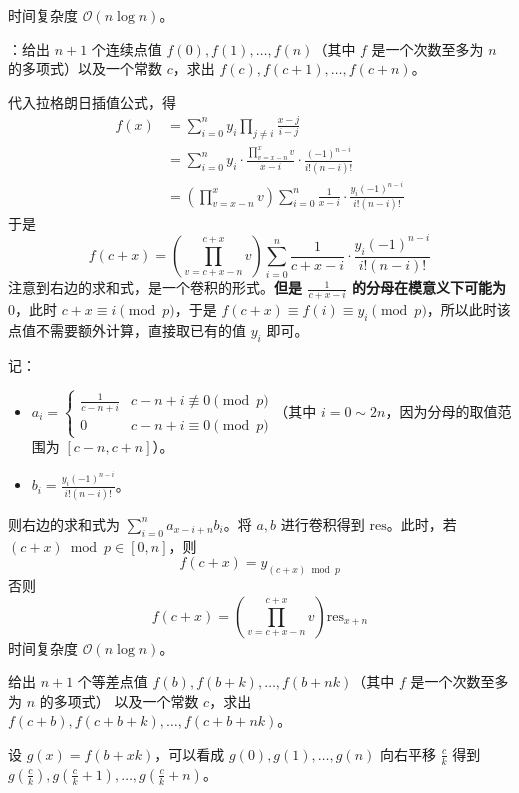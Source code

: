 时间复杂度 $\mathcal{O}(n \log n)$。

：给出 $n + 1$ 个连续点值 $f(0), f(1), \dots, f(n)$（其中 $f$ 是一个次数至多为 $n$ 的多项式）以及一个常数 $c$，求出 $f(c), f(c + 1), \dots, f(c + n)$。

代入拉格朗日插值公式，得
\[
\begin{aligned}
f(x) & = \sum_{i = 0}^n y_i \prod_{j \neq i} \frac{x - j}{i - j} \\
& = \sum_{i = 0}^n y_i \cdot \frac{\prod_{v = x - n}^{x} v}{x - i} \cdot \frac{(-1)^{n - i}}{i!(n - i)!} \\
& = \left(\prod_{v = x - n}^{x} v\right) \sum_{i = 0}^n \frac{1}{x - i} \cdot \frac{y_i(-1)^{n - i}}{i!(n - i)!}
\end{aligned}
\]
于是
\[
f(c + x) = \left( \prod_{v = c + x - n}^{c + x} v \right)\sum_{i = 0}^n \frac{1}{c + x - i} \cdot \frac{y_i(-1)^{n - i}}{i!(n - i)!}
\]
注意到右边的求和式，是一个卷积的形式。\textbf{但是 $\frac{1}{c + x - i}$ 的分母在模意义下可能为 $0$}，此时 $c + x \equiv i \pmod{p}$，于是 $f(c + x) \equiv f(i) \equiv y_i \pmod{p}$，所以此时该点值不需要额外计算，直接取已有的值 $y_i$ 即可。

记：

\begin{itemize}
    \item $a_i = \begin{cases} \frac{1}{c - n + i} & c - n + i \not\equiv 0 \pmod{p} \\ 0 & c - n + i \equiv 0 \pmod{p} \end{cases}$（其中 $i = 0 \sim 2n$，因为分母的取值范围为 $[c - n, c + n]$）。
    \item $b_i = \frac{y_i(-1)^{n - i}}{i!(n - i)!}$。
\end{itemize}

则右边的求和式为 $\sum_{i = 0}^n a_{x - i + n}b_i$。将 $a, b$ 进行卷积得到 $\mathrm{res}$。此时，若 $(c + x) \bmod p \in [0, n]$，则
\[
f(c + x) = y_{(c + x) \bmod p}
\]
否则
\[
f(c + x) = \left( \prod_{v = c + x - n}^{c + x} v \right) \mathrm{res}_{x + n}
\]
时间复杂度 $\mathcal{O}(n \log n)$。

\begin{quoteblock}
给出 $n + 1$ 个等差点值 $f(b), f(b + k), \dots, f(b + nk)$（其中 $f$ 是一个次数至多为 $n$ 的多项式） 以及一个常数 $c$，求出 $f(c + b), f(c + b + k), \dots, f(c + b + nk)$。

设 $g(x) = f(b + xk)$，可以看成 $g(0), g(1), \dots, g(n)$ 向右平移 $\frac{c}{k}$ 得到 $g(\frac{c}{k}), g(\frac{c}{k} + 1), \dots, g(\frac{c}{k} + n)$。
\end{quoteblock}

